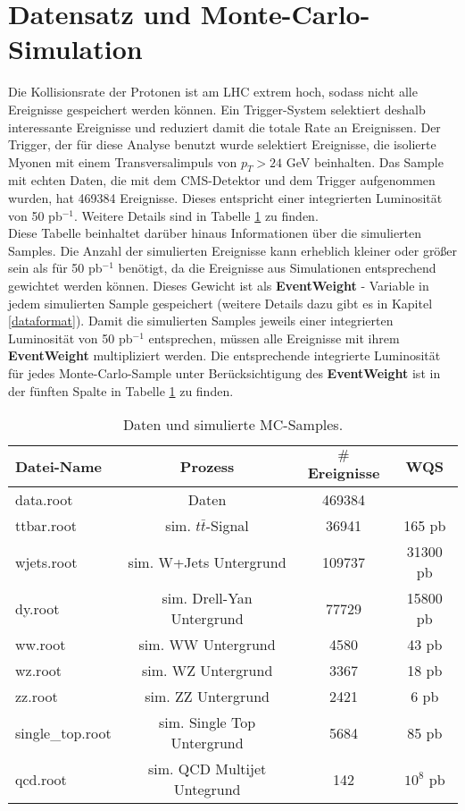 \section{Datensatz und Monte-Carlo-Simulation}
\label{datasets}
Die Kollisionsrate der Protonen ist am LHC extrem hoch, sodass nicht alle Ereignisse gespeichert werden k\"onnen. Ein Trigger-System selektiert deshalb interessante Ereignisse und reduziert damit die totale Rate an Ereignissen. Der Trigger, der f\"ur diese Analyse benutzt wurde selektiert Ereignisse, die isolierte Myonen mit einem Transversalimpuls von $p_{T}>24$ GeV beinhalten. Das Sample mit echten Daten, die mit dem CMS-Detektor und dem Trigger aufgenommen wurden, hat 469384 Ereignisse. Dieses entspricht einer integrierten Luminosit\"at von 50 pb$^{-1}$. Weitere Details sind in Tabelle \ref{table_samples} zu finden.\\
Diese Tabelle beinhaltet dar\"uber hinaus Informationen \"uber die simulierten Samples. Die Anzahl der simulierten Ereignisse kann erheblich kleiner oder gr\"o\ss{}er sein als f\"ur 50 pb$^{-1}$ ben\"otigt, da die Ereignisse aus Simulationen entsprechend gewichtet werden k\"onnen. Dieses Gewicht ist als \textbf{EventWeight} - Variable in jedem simulierten Sample gespeichert (weitere Details dazu gibt es in Kapitel \ref{dataformat}). Damit die simulierten Samples jeweils einer integrierten Luminosit\"at von 50 pb$^{-1}$ entsprechen, m\"ussen alle Ereignisse mit ihrem \textbf{EventWeight} multipliziert werden. Die entsprechende integrierte Luminosit\"at f\"ur jedes Monte-Carlo-Sample unter Ber\"ucksichtigung des \textbf{EventWeight} ist in der f\"unften Spalte in Tabelle \ref{table_samples} zu finden. 
\begin{small}
\begin{table}[h!]
  \centering
  \begin{tabular}{|l|c|c|c|}
    \hline 
Datei-Name & Prozess & $\#$Ereignisse & WQS \\ \hline\hline
data.root & Daten & 469384 & \\ \hline
ttbar.root & sim. $t\bar{t}$-Signal & 36941 & 165 pb  \\
wjets.root & sim. W+Jets Untergrund & 109737 & 31300 pb \\
dy.root & sim. Drell-Yan Untergrund & 77729 & 15800 pb \\
ww.root & sim. WW Untergrund & 4580 & 43 pb \\
wz.root & sim. WZ Untergrund & 3367 & 18 pb \\
zz.root & sim. ZZ Untergrund & 2421 & 6 pb \\
single\_top.root & sim. Single Top Untergrund & 5684 & 85 pb \\
qcd.root & sim. QCD Multijet Untegrund & 142 & $10^8$ pb \\
    \hline
  \end{tabular}
  \caption{Daten und simulierte MC-Samples.}
  \label{table_samples}
\end{table}
\end{small}
